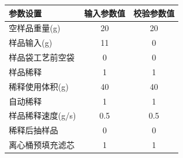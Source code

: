 \documentclass[UTF8,10pt,a4paper,fontset=fandol]{ctexart}
\newcommand{\fieldvalue}[1]{#1}
\begin{document}
\begin{tabularx}{\textwidth}{@{}X c c@{}}
\textbf{参数设置} & \textbf{输入参数值} & \textbf{校验参数值} \\ \hline
空样品重量(g) &
\fieldvalue{20} &
\fieldvalue{20} \\

样品输入(g) &
\fieldvalue{11} &
\fieldvalue{0} \\

样品袋工艺前空袋 &
\fieldvalue{0} &
\fieldvalue{0} \\

样品稀释 &
\fieldvalue{1} &
\fieldvalue{1} \\

稀释使用体积(g) &
\fieldvalue{40} &
\fieldvalue{40} \\

自动稀释 &
\fieldvalue{1} &
\fieldvalue{1} \\

样品稀释速度(g/s) &
\fieldvalue{0.5} &
\fieldvalue{0.5} \\

稀释后抽样品 &
\fieldvalue{0} &
\fieldvalue{0} \\

离心桶预填充滤芯 &
\fieldvalue{1} &
\fieldvalue{1} \\


\end{tabularx}
\end{document}
